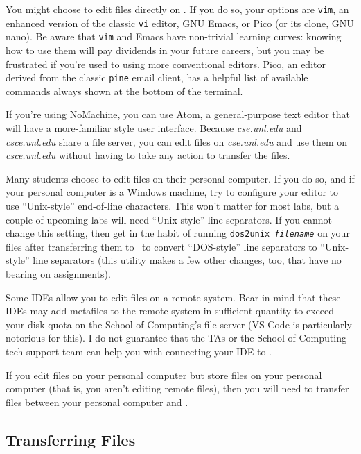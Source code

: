 You might choose to edit files directly on \runtimeenvironment.
If you do so, your options are \texttt{vim}, an enhanced version of the classic \texttt{vi} editor, GNU Emacs, or Pico (or its clone, GNU nano).
Be aware that \texttt{vim} and Emacs have non-trivial learning curves: knowing how to use them will pay dividends in your future careers, but you may be frustrated if you're used to using more conventional editors.
Pico, an editor derived from the classic \texttt{pine} email client, has a helpful list of available commands always shown at the bottom of the terminal.

If you're using NoMachine, you can use Atom, a general-purpose text editor that will have a more-familiar style user interface.
Because \textit{cse.unl.edu} and \textit{csce.unl.edu} share a file server, you can edit files on \textit{cse.unl.edu} and use them on \textit{csce.unl.edu} without having to take any action to transfer the files.

Many students choose to edit files on their personal computer.
If you do so, and if your personal computer is a Windows machine, try to configure your editor to use ``Unix-style'' end-of-line characters.
This won't matter for most labs, but a couple of upcoming labs will need ``Unix-style'' line separators.
If you cannot change this setting, then get in the habit of running \texttt{dos2unix \textit{filename}} on your files after transferring them to \runtimeenvironment\ to convert ``DOS-style'' line separators to ``Unix-style'' line separators (this utility makes a few other changes, too, that have no bearing on \coursenumber assignments).

Some IDEs allow you to edit files on a remote system.
Bear in mind that these IDEs may add metafiles to the remote system in sufficient quantity to exceed your disk quota on the School of Computing's file server (VS Code is particularly notorious for this).
I do not guarantee that the TAs or the School of Computing tech support team can help you with connecting your IDE to \runtimeenvironment.

If you edit files on your personal computer but store files on your personal computer (that is, you aren't editing remote files), then you will need to transfer files between your personal computer and \runtimeenvironment.

\subsection{Transferring Files}

